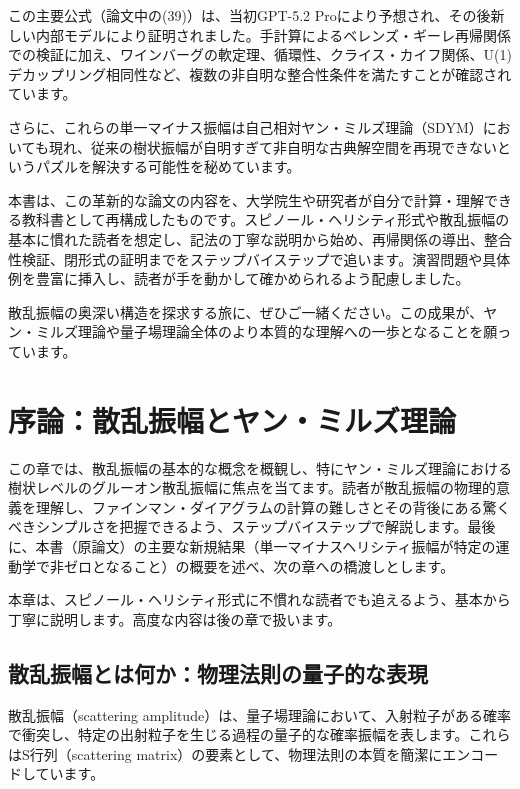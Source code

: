 \documentclass[dvipdfmx,a4paper]{jsbook}
\theoremstyle{definition}
\theoremstyle{remark}
\begin{document}
この主要公式（論文中の(39)）は、当初GPT-5.2 Proにより予想され、その後新しい内部モデルにより証明されました。手計算によるベレンズ・ギーレ再帰関係での検証に加え、ワインバーグの軟定理、循環性、クライス・カイフ関係、U(1)デカップリング相同性など、複数の非自明な整合性条件を満たすことが確認されています。

さらに、これらの単一マイナス振幅は自己相対ヤン・ミルズ理論（SDYM）においても現れ、従来の樹状振幅が自明すぎて非自明な古典解空間を再現できないというパズルを解決する可能性を秘めています。

本書は、この革新的な論文の内容を、大学院生や研究者が自分で計算・理解できる教科書として再構成したものです。スピノール・ヘリシティ形式や散乱振幅の基本に慣れた読者を想定し、記法の丁寧な説明から始め、再帰関係の導出、整合性検証、閉形式の証明までをステップバイステップで追います。演習問題や具体例を豊富に挿入し、読者が手を動かして確かめられるよう配慮しました。

散乱振幅の奥深い構造を探求する旅に、ぜひご一緒ください。この成果が、ヤン・ミルズ理論や量子場理論全体のより本質的な理解への一歩となることを願っています。

\vspace{2em}

\mainmatter

\chapter{序論：散乱振幅とヤン・ミルズ理論}

この章では、散乱振幅の基本的な概念を概観し、特にヤン・ミルズ理論における樹状レベルのグルーオン散乱振幅に焦点を当てます。読者が散乱振幅の物理的意義を理解し、ファインマン・ダイアグラムの計算の難しさとその背後にある驚くべきシンプルさを把握できるよう、ステップバイステップで解説します。最後に、本書（原論文）の主要な新規結果（単一マイナスヘリシティ振幅が特定の運動学で非ゼロとなること）の概要を述べ、次の章への橋渡しとします。

本章は、スピノール・ヘリシティ形式に不慣れな読者でも追えるよう、基本から丁寧に説明します。高度な内容は後の章で扱います。

\section{散乱振幅とは何か：物理法則の量子的な表現}

散乱振幅（scattering amplitude）は、量子場理論において、入射粒子がある確率で衝突し、特定の出射粒子を生じる過程の量子的な確率振幅を表します。これらはS行列（scattering matrix）の要素として、物理法則の本質を簡潔にエンコードしています。
\end{document}
